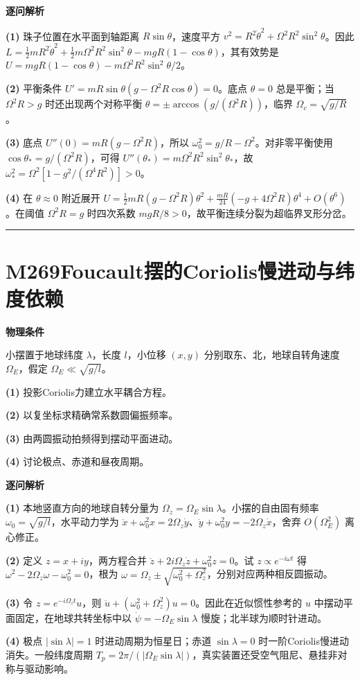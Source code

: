 \documentclass[UTF8,a4paper,11pt,oneside,openany]{ctexbook}
\begin{document}
\par\medskip\noindent\textbf{逐问解析}
\par\noindent\textbf{(1)} 珠子位置在水平面到轴距离 \(R\sin\theta\)，速度平方 \(v^2=R^2\dot\theta^2+\Omega^2R^2\sin^2\theta\)。因此 \(L=\tfrac12mR^2\dot\theta^2+\tfrac12m\Omega^2R^2\sin^2\theta-mgR(1-\cos\theta)\)，其有效势是 \(U=m gR(1-\cos\theta)-m\Omega^2R^2\sin^2\theta/2\)。
\par\noindent\textbf{(2)} 平衡条件 \(U'=mR\sin\theta(g-\Omega^2R\cos\theta)=0\)。底点 \(\theta=0\) 总是平衡；当 \(\Omega^2R>g\) 时还出现两个对称平衡 \(\theta=\pm\arccos(g/(\Omega^2R))\)，临界 \(\Omega_c=\sqrt{g/R}\)。
\par\noindent\textbf{(3)} 底点 \(U''(0)=mR(g-\Omega^2R)\)，所以 \(\omega_0^2=g/R-\Omega^2\)。对非零平衡使用 \(\cos\theta_*=g/(\Omega^2R)\)，可得 \(U''(\theta_*)=m\Omega^2R^2\sin^2\theta_*\)，故 \(\omega_*^2=\Omega^2[1-g^2/(\Omega^4R^2)]>0\)。
\par\noindent\textbf{(4)} 在 \(\theta\approx0\) 附近展开 \(U=\tfrac12mR(g-\Omega^2R)\theta^2+\frac{mR}{24}(-g+4\Omega^2R)\theta^4+O(\theta^6)\)。在阈值 \(\Omega^2R=g\) 时四次系数 \(m gR/8>0\)，故平衡连续分裂为超临界叉形分岔。

\par\bigskip\hrule\bigskip
\section*{M269\quad Foucault摆的Coriolis慢进动与纬度依赖}
\textbf{物理条件}\par 小摆置于地球纬度 \(\lambda\)，长度 \(l\)，小位移 \((x,y)\) 分别取东、北，地球自转角速度 \(\Omega_E\)，假定 \(\Omega_E\ll\sqrt{g/l}\)。
\par\noindent\textbf{(1)} 投影Coriolis力建立水平耦合方程。
\par\noindent\textbf{(2)} 以复坐标求精确常系数圆偏振频率。
\par\noindent\textbf{(3)} 由两圆振动拍频得到摆动平面进动。
\par\noindent\textbf{(4)} 讨论极点、赤道和昼夜周期。

\par\medskip\noindent\textbf{逐问解析}
\par\noindent\textbf{(1)} 本地竖直方向的地球自转分量为 \(\Omega_z=\Omega_E\sin\lambda\)。小摆的自由固有频率 \(\omega_0=\sqrt{g/l}\)，水平动力学为 \(\ddot x+\omega_0^2x=2\Omega_z\dot y\)、\(\ddot y+\omega_0^2y=-2\Omega_z\dot x\)，舍弃 \(O(\Omega_E^2)\) 离心修正。
\par\noindent\textbf{(2)} 定义 \(z=x+iy\)，两方程合并 \(\ddot z+2i\Omega_z\dot z+\omega_0^2z=0\)。试 \(z\propto e^{-i\omega t}\) 得 \(\omega^2-2\Omega_z\omega-\omega_0^2=0\)，根为 \(\omega=\Omega_z\pm\sqrt{\omega_0^2+\Omega_z^2}\)，分别对应两种相反圆振动。
\par\noindent\textbf{(3)} 令 \(z=e^{-i\Omega_z t}u\)，则 \(\ddot u+(\omega_0^2+\Omega_z^2)u=0\)。因此在近似惯性参考的 \(u\) 中摆动平面固定，在地球共转坐标中以 \(\dot\psi=-\Omega_E\sin\lambda\) 慢旋；北半球为顺时针进动。
\par\noindent\textbf{(4)} 极点 \(|\sin\lambda|=1\) 时进动周期为恒星日；赤道 \(\sin\lambda=0\) 时一阶Coriolis慢进动消失。一般纬度周期 \(T_p=2\pi/(|\Omega_E\sin\lambda|)\)，真实装置还受空气阻尼、悬挂非对称与驱动影响。
\end{document}
